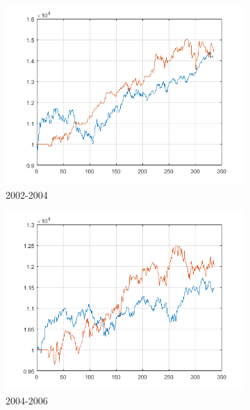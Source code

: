 \documentclass[11pt,a4,twosided,singlespacing,titlepagenumber=on]{scrreprt}
\numberwithin{equation}{chapter} %
\theoremstyle{remark}
\begin{document}
\begin{figure}[H]
\begin{subfigure}[t]{0.32\textwidth}
        \includegraphics[width=1\textwidth]{res/backtest/7}
        \caption{2002-2004}
    \end{subfigure}
    \begin{subfigure}[t]{0.32\textwidth}
        \centering
        \includegraphics[width=1\textwidth]{res/backtest/8}
        \caption{2004-2006}
    \end{subfigure}
    \begin{subfigure}[t]{0.32\textwidth}
        \centering

\end{subfigure}
\end{figure}
\end{document}
